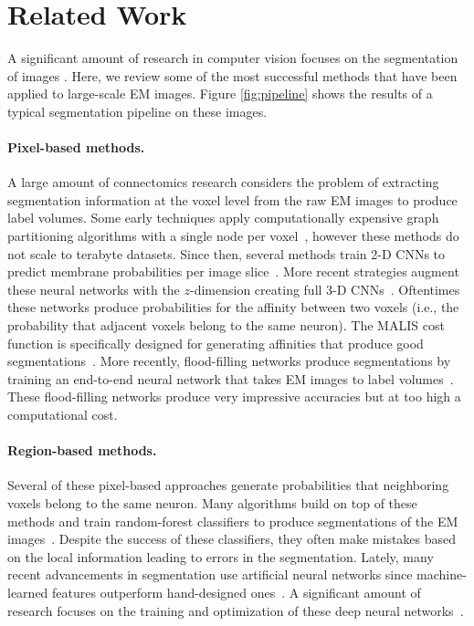 \section{Related Work}

A significant amount of research in computer vision focuses on the segmentation of images \cite{zaitoun2015survey}. 
Here, we review some of the most successful methods that have been applied to large-scale EM images. Figure \ref{fig:pipeline} shows the results of a typical segmentation pipeline on these images. 

\paragraph{Pixel-based methods.} 

A large amount of connectomics research considers the problem of extracting segmentation information at the voxel level from the raw EM images to produce label volumes.
Some early techniques apply computationally expensive graph partitioning algorithms with a single node per voxel~\cite{andres2012globally}, however these methods do not scale to terabyte datasets.
Since then, several methods train 2-D CNNs to predict membrane probabilities per image slice~\cite{ciresan2012deep,jain2010boundary,kaynig2015large,rhoananet,amelio_segmentation}. 
More recent strategies augment these neural networks with the $z$-dimension creating full 3-D CNNs~\cite{lee2015recursive,ronneberger2015u}.
Oftentimes these networks produce probabilities for the affinity between two voxels (i.e., the probability that adjacent voxels belong to the same neuron).
The MALIS cost function is specifically designed for generating affinities that produce good segmentations~\cite{briggman2009maximin}. 
More recently, flood-filling networks produce segmentations by training an end-to-end neural network that takes EM images to label volumes~\cite{januszewski2016flood}.
These flood-filling networks produce very impressive accuracies but at too high a computational cost.


\paragraph{Region-based methods.} 

Several of these pixel-based approaches generate probabilities that neighboring voxels belong to the same neuron.
Many algorithms build on top of these methods and train random-forest classifiers to produce segmentations of the EM images~\cite{seymour2016rhoananet,nunez2014graph,10.1371/journal.pone.0125825,parag2017anisotropic,zlateski2015image}. 
Despite the success of these classifiers, they often make mistakes based on the local information leading to errors in the segmentation. 
Lately, many recent advancements in segmentation use artificial neural networks since machine-learned features outperform hand-designed ones~\cite{bogovic2013learned}.
A significant amount of research focuses on the training and optimization of these deep neural networks~\cite{chatfield2014return,maas2013rectifier,nesterov1983method}. 


